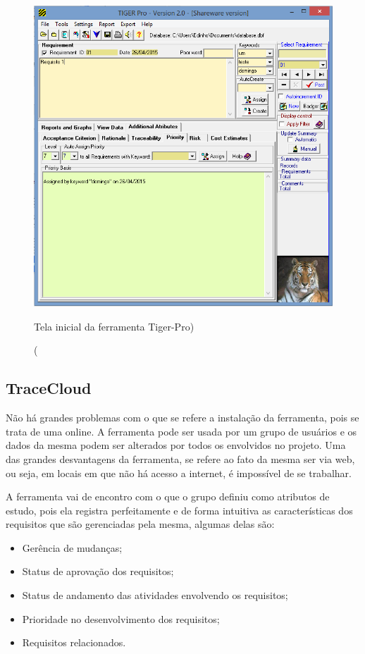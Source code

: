 \begin{figure}[!htb]
\centering
\includegraphics[scale=0.6]{figuras/tiger-pro.png}
\caption(Tela inicial da ferramenta Tiger-Pro)
\end{figure}

\subsection{TraceCloud}
Não há grandes problemas com o que se refere a instalação da ferramenta, pois se trata de uma online. A ferramenta pode ser usada por um grupo de usuários e os dados da mesma podem ser alterados por todos os envolvidos no projeto. Uma das grandes desvantagens da ferramenta, se refere ao fato da mesma ser via web, ou seja, em locais em que não há acesso a internet, é impossível de se trabalhar.

A ferramenta vai de encontro com o que o grupo definiu como atributos de estudo, pois ela registra perfeitamente e de forma intuitiva as características dos requisitos que são gerenciadas pela mesma, algumas delas são:
\begin{itemize}
  \item Gerência de mudanças;
  \item Status de aprovação dos requisitos;
  \item Status de andamento das atividades envolvendo os requisitos;
  \item Prioridade no desenvolvimento dos requisitos;
  \item Requisitos relacionados.
\end{itemize}

